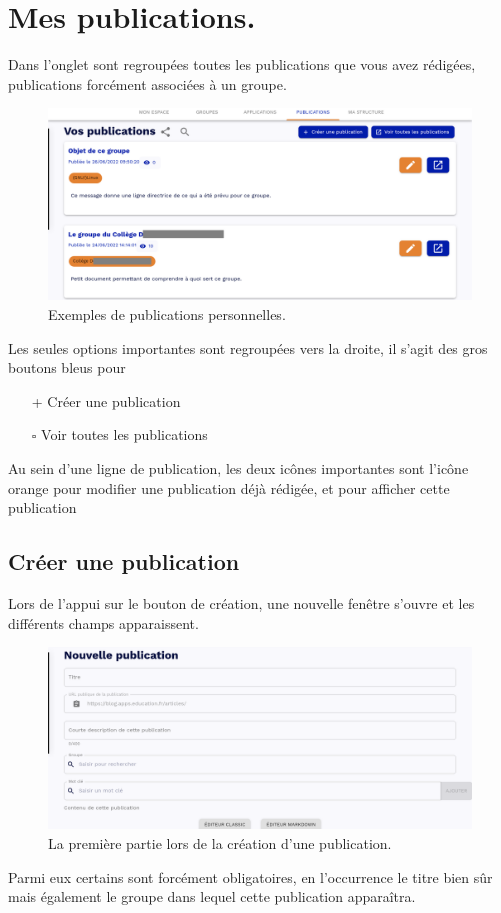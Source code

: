 \section{Mes publications.}
Dans l'onglet  sont regroupées toutes les publications que vous avez rédigées, publications forcément associées à un groupe.
\begin{figure}
	\centering
	\includegraphics{./Captures/portail.publications.exemples.png}
	\caption{Exemples de publications personnelles.}
\end{figure}
Les seules options importantes sont regroupées vers la droite, il s'agit des gros boutons bleus pour
\begin{itemize}
	\item[+] Créer une publication
	\item[$\square$] Voir toutes les publications
\end{itemize}

Au sein d'une ligne de publication, les deux icônes importantes sont l'icône orange pour modifier une publication déjà rédigée, et pour afficher cette publication

\subsection{Créer une publication}
Lors de l'appui sur le bouton de création, une nouvelle fenêtre s'ouvre et les différents champs apparaissent. 
\begin{figure}
	\centering
	\includegraphics{./Captures/portail.publications.creer.publication.1.png}
	\caption{La première partie lors de la création d'une publication.}
\end{figure}
Parmi eux certains sont forcément obligatoires, en l'occurrence le titre bien sûr mais également le groupe dans lequel cette publication apparaîtra.

